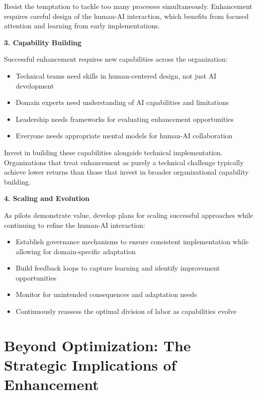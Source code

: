 \documentclass[
  Letterpaper,
]{scrbook}
\begin{document}
Resist the temptation to tackle too many processes simultaneously.
Enhancement requires careful design of the human-AI interaction, which
benefits from focused attention and learning from early implementations.

\textbf{3. Capability Building}

Successful enhancement requires new capabilities across the
organization:

\begin{itemize}
\item
  Technical teams need skills in human-centered design, not just AI
  development
\item
  Domain experts need understanding of AI capabilities and limitations
\item
  Leadership needs frameworks for evaluating enhancement opportunities
\item
  Everyone needs appropriate mental models for human-AI collaboration
\end{itemize}

Invest in building these capabilities alongside technical
implementation. Organizations that treat enhancement as purely a
technical challenge typically achieve lower returns than those that
invest in broader organizational capability building.

\textbf{4. Scaling and Evolution}

As pilots demonstrate value, develop plans for scaling successful
approaches while continuing to refine the human-AI interaction:

\begin{itemize}
\item
  Establish governance mechanisms to ensure consistent implementation
  while allowing for domain-specific adaptation
\item
  Build feedback loops to capture learning and identify improvement
  opportunities
\item
  Monitor for unintended consequences and adaptation needs
\item
  Continuously reassess the optimal division of labor as capabilities
  evolve
\end{itemize}

\section{Beyond Optimization: The Strategic Implications of
Enhancement}\label{beyond-optimization-the-strategic-implications-of-enhancement}
\end{document}
